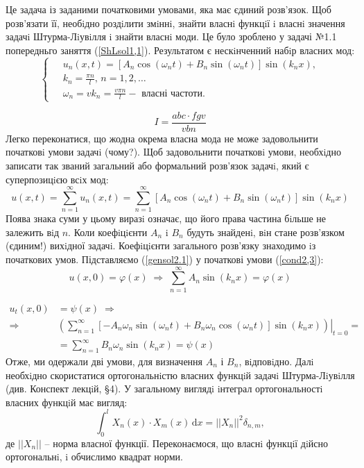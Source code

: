 Це задача із заданими початковими умовами, яка має єдиний розв'язок. Щоб розв’язати її, необiдно роздiлити змiннi, знайти власнi функцiї i власнi значення задачi Штурма-Лiувiлля i знайти власнi моди. Це було зроблено у  задачі №1.1 попередньго заняття (\ref{ShLsol1,1}). Результатом є нескiнченний набiр власних мод: 
\begin{equation}
    \left\{ \begin{aligned} \label{mode2.1}
        \;&u_n(x,t) = \left[A_n\cos(\omega_n t) + B_n\sin(\omega_n t)\right] \sin(k_n x), \\
        &k_n = \frac{\pi n}{l}, \, n = 1, 2,\ldots\\
        &\omega_n = vk_n = \frac{v \pi n}{l} - \text{ власні частоти}.
    \end{aligned}\right.
\end{equation}

\begin{equation*}
    I = \frac{abc \cdot fgv}{vbn}
\end{equation*}
Легко переконатися, що жодна окрема власна мода не може задовольнити початковi умови задачi (чому?). Щоб задовольнити початковi умови, необхiдно записати так званий загальний або формальний розв’язок задачi, який є суперпозицiєю всiх мод:
\begin{equation} \label{gensol2.1}
    u(x,t) = \sum^{\infty}_{n=1} u_n(x,t) = \sum^{\infty}_{n=1} \left[A_n\cos(\omega_n t) + B_n\sin(\omega_n t)\right] \sin(k_n x)
\end{equation}
Поява знака суми у цьому виразi означає, що його права частина бiльше не залежить вiд $n$. Коли коефiцiєнти $A_n$ i $B_n$ будуть знайденi, вiн стане розв’язком (єдиним!) вихiдної задачi. Коефiцiєнти загального розв’язку знаходимо iз початкових умов. Підставляємо (\ref{gensol2.1}) у початкові умови (\ref{cond2,3}):
\begin{equation} \label{init-pos2,3}
    u(x,0) = \varphi(x) \;\Rightarrow\; \sum^{\infty}_{n=1} A_n\sin(k_n x) = \varphi(x)
\end{equation}

\begin{equation} \label{init-vel2,3}
    \begin{aligned}
        u_t(x,0) &= \psi(x)
        \;\Rightarrow\\
        \Rightarrow& \left.\left(\sum^{\infty}_{n=1}\left[-A_n\omega_n\sin(\omega_n t) + B_n\omega_n\cos(\omega_n t)\right] \sin(k_n x)\right)\right|_{t=0} =\\
        &= \sum^{\infty}_{n=1} B_n\omega_n\sin(k_n x) = \psi(x)
    \end{aligned}
\end{equation}
Отже, ми одержали дві умови, для визначення $A_n$ і $B_n$, вiдповiдно. Далi необхiдно скористатися ортогональнiстю власних функцiй задачi Штурма-Лiувiлля (див. Конспект лекцiй, §4). У загальному виглядi iнтеграл ортогональностi власних функцiй має вигляд:
\begin{equation} \label{orth2,3}
    \int_0^l X_n(x) \cdot X_m(x) \,\mathrm{d}x = ||X_n||^2\delta_{n,m},
\end{equation}
де $||X_n||$ -- норма власної функції. Переконаємося, що власнi функцiї дiйсно ортогональнi, i обчислимо квадрат норми.

